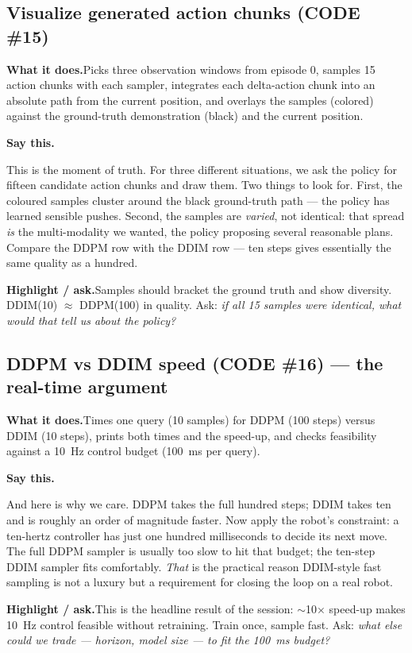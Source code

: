 \documentclass[11pt]{article}
\newenvironment{saythis}{%
  \par\smallskip\noindent
  \begin{list}{}{%
    \setlength{\leftmargin}{1.2em}%
    \setlength{\rightmargin}{0.5em}%
    \setlength{\topsep}{2pt}%
  }\item\relax
  \color{sayrule}\textbf{Say this.}\hspace{0.4em}\color{black}\itshape
}{%
  \end{list}\par\smallskip
}
\newcommand{\highlight}[1]{\par\smallskip\noindent\textcolor{hlcolor}{\textbf{Highlight / ask.}}\hspace{0.4em}#1\par\smallskip}
\newcommand{\whatdoes}[1]{\par\noindent\textbf{What it does.}\hspace{0.4em}#1\par}
\begin{document}
\subsection{Visualize generated action chunks (CODE \#15)}
\whatdoes{Picks three observation windows from episode 0, samples 15 action chunks with each sampler,
integrates each delta-action chunk into an absolute path from the current position, and overlays the
samples (colored) against the ground-truth demonstration (black) and the current position.}
\begin{saythis}
This is the moment of truth. For three different situations, we ask the policy for fifteen candidate
action chunks and draw them. Two things to look for. First, the coloured samples cluster around the
black ground-truth path --- the policy has learned sensible pushes. Second, the samples are \emph{varied},
not identical: that spread \emph{is} the multi-modality we wanted, the policy proposing several
reasonable plans. Compare the DDPM row with the DDIM row --- ten steps gives essentially the same quality
as a hundred.
\end{saythis}
\highlight{Samples should bracket the ground truth and show diversity. DDIM(10) $\approx$ DDPM(100) in
quality. Ask: \emph{if all 15 samples were identical, what would that tell us about the policy?}}

\subsection{DDPM vs DDIM speed (CODE \#16) --- the real-time argument}
\whatdoes{Times one query (10 samples) for DDPM (100 steps) versus DDIM (10 steps), prints both times and
the speed-up, and checks feasibility against a 10~Hz control budget (100~ms per query).}
\begin{saythis}
And here is why we care. DDPM takes the full hundred steps; DDIM takes ten and is roughly an order of
magnitude faster. Now apply the robot's constraint: a ten-hertz controller has just one hundred
milliseconds to decide its next move. The full DDPM sampler is usually too slow to hit that budget; the
ten-step DDIM sampler fits comfortably. \emph{That} is the practical reason DDIM-style fast sampling is
not a luxury but a requirement for closing the loop on a real robot.
\end{saythis}
\highlight{This is the headline result of the session: $\sim$10$\times$ speed-up makes 10~Hz control
feasible without retraining. Train once, sample fast. Ask: \emph{what else could we trade --- horizon,
model size --- to fit the 100~ms budget?}}
\end{document}
